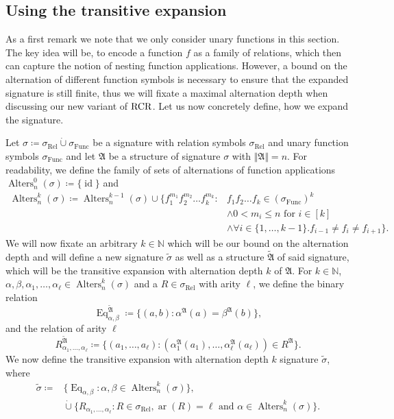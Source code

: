 \subsection{Using the transitive expansion} 

As a first remark we note that we only consider unary functions in this section.
The key idea will be, to encode a function $f$ as a family of relations, which then can capture the notion of nesting function applications.
However, a bound on the alternation of different function symbols is necessary to ensure that the expanded signature is still finite, thus we will fixate a maximal alternation depth when discussing our new variant of $\operatorname{RCR}$.
Let us now concretely define, how we expand the signature.

\begin{definition}
	Let $\sigma\coloneqq \sigma_{\operatorname{Rel}} \operatorname{\dot{\cup}} \sigma_{\operatorname{Func}}$ be a signature with relation symbols $\sigma_{\operatorname{Rel}}$ and unary function symbols $\sigma_{\operatorname{Func}}$ and let $\mathfrak A$ be a structure of signature $\sigma$ with $\Vert \mathfrak A \Vert=n$.
	For readability, we define the family of sets of alternations of function applications $\operatorname{Alters}_n^0(\sigma)\coloneqq\{\operatorname{id}\}$ and
	\begin{align*}
		\operatorname{Alters}^k_{n}(\sigma)\coloneqq \operatorname{Alters}^{k-1}_{n}(\sigma)\cup\{f_1^{m_1}f_2^{m_2}\dots f_k^{m_k} : & f_1f_2\dots f_k\in (\sigma_{\operatorname{Func}})^k \\ 
		& \land 0 < m_i \leq n \text{ for } i \in [k] \\ 
		& \land \forall i\in\{1,\dots,k-1\} . f_{i-1}\neq f_i \neq f_{i+1}\}.
	\end{align*}
	We will now fixate an arbitrary $k\in\mathbb N$ which will be our bound on the alternation depth and will define a new signature $\widetilde{\sigma}$ as well as a structure $\widetilde{\mathfrak A}$ of said signature, which will be the transitive expansion with alternation depth $k$ of $\mathfrak{A}$.
	For $k\in\mathbb N$, $\alpha,\beta,\alpha_1,\dots,\alpha_\ell\in \operatorname{Alters}^k_n(\sigma)$ and a $R\in \sigma_{\operatorname{Rel}}$ with arity $\ell$, we define the binary relation
	$$\operatorname{Eq}_{\alpha,\beta}^{\widetilde{\mathfrak A}}\coloneqq \{(a,b) : \alpha^{\mathfrak A}(a)=\beta^{\mathfrak A}(b)\},$$
	and the relation of arity $\ell$
	$$R_{\alpha_1,\dots,\alpha_\ell}^{\widetilde{\mathfrak A}} \coloneqq \{(a_1,\dots,a_\ell) : (\alpha_1^{\mathfrak A}(a_1),\dots,\alpha_\ell^{\mathfrak A}(a_\ell))\in R^{\mathfrak A}\}.$$
	We now define the transitive expansion with alternation depth $k$ signature $\widetilde{\sigma}$, where 
	\begin{align*}
		\widetilde{\sigma}\coloneqq & \{\operatorname{Eq}_{\alpha,\beta}: \alpha,\beta\in\operatorname{Alters}^k_n(\sigma)\}, \\
		& \operatorname{\dot{\cup}} \{R_{\alpha_1,\dots,\alpha_\ell} : R\in \sigma_{\operatorname{Rel}},\operatorname{ar}(R)=\ell \text{ and } \alpha\in \operatorname{Alters}^k_n(\sigma)\}.
	\end{align*}
\end{definition}

